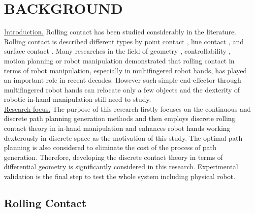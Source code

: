 \section{BACKGROUND}
\uline{Introduction.} 
Rolling contact has been studied considerably in the literature. Rolling contact is described different types by point contact \cite{Cai86_PlanarMotion_PointContact, Cai87_SpatialMotion_PointContact} , line contact \cite{Cai88_SpatialMotion_LineContact}, and surface contact \cite{Borisov08_ChaplypinBall_FixSphere}. Many researches in the field of geometry \cite{Montana88_Kinematics_Contact_Grasp}, controllability \cite{Marigo00_RollingBodies_Controllability}, motion planning \cite{Z.Li91_NonholonomicMotionPlanning} or robot manipulation \cite{Murray-Li_EbookRobotic_Manipulation} demonstrated that rolling contact in terms of robot manipulation, especially in multifingered robot hands, has played an important role in recent decades. However such simple end-effector through multifingered robot hands can relocate only a few objects and the dexterity of robotic in-hand manipulation still need to study.\\


\noindent\uline{Research focus.}
The purpose of this research firstly focuses on the continuous and discrete path planning generation methods and then employs discrete rolling contact theory in in-hand manipulation and enhances robot hands working dexterously in discrete space as the motivation of this study. The optimal path planning is also considered to eliminate the cost of the process of path generation. Therefore, developing the discrete contact theory in terms of differential geometry is significantly considered in this research. Experimental validation is the final step to test the whole system including physical robot.

\subsection{Rolling Contact}

